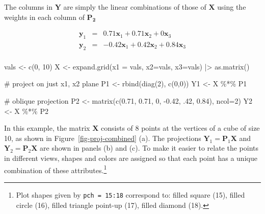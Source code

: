 \documentclass[
  letterpaper,
  10pt,
  krantz2]{krantz}
\makeatletter
\newenvironment{Shaded}{\begin{snugshade}}{\end{snugshade}}
\newcommand{\AttributeTok}[1]{\textcolor[rgb]{0.40,0.45,0.13}{#1}}
\newcommand{\CommentTok}[1]{\textcolor[rgb]{0.37,0.37,0.37}{#1}}
\newcommand{\DecValTok}[1]{\textcolor[rgb]{0.68,0.00,0.00}{#1}}
\newcommand{\FloatTok}[1]{\textcolor[rgb]{0.68,0.00,0.00}{#1}}
\newcommand{\FunctionTok}[1]{\textcolor[rgb]{0.28,0.35,0.67}{#1}}
\newcommand{\NormalTok}[1]{\textcolor[rgb]{0.00,0.23,0.31}{#1}}
\newcommand{\OtherTok}[1]{\textcolor[rgb]{0.00,0.23,0.31}{#1}}
\newcommand{\SpecialCharTok}[1]{\textcolor[rgb]{0.37,0.37,0.37}{#1}}
\newenvironment{kframe}{%
  \medskip{}
  \setlength{\fboxsep}{.8em}
  \def\at@end@of@kframe{}%
  \ifinner\ifhmode%
  \def\at@end@of@kframe{\end{minipage}}%
  \begin{minipage}{\columnwidth}%
  \fi\fi%
  \def\FrameCommand##1{\hskip\@totalleftmargin \hskip-\fboxsep
  \colorbox{shadecolor}{##1}\hskip-\fboxsep
      \hskip-\linewidth \hskip-\@totalleftmargin \hskip\columnwidth}%
  \MakeFramed {\advance\hsize-\width
    \@totalleftmargin\z@ \linewidth\hsize
    \@setminipage}}%
{\par\unskip\endMakeFramed%
  \at@end@of@kframe}
\renewenvironment{Shaded}{\begin{kframe}}{\end{kframe}}
\makeatother
\begin{document}
The columns in \(\mathbf{Y}\) are simply the linear combinations of
those of \(\mathbf{X}\) using the weights in each column of
\(\mathbf{P_2}\)

\[
\begin{eqnarray*}
\mathbf{y}_1 & = & 0.71 \mathbf{x}_1 + 0.71 \mathbf{x}_2 + 0 \mathbf{x}_3\\
\mathbf{y}_2 & = & -0.42 \mathbf{x}_1 + 0.42 \mathbf{x}_2 + 0.84 \mathbf{x}_3 \\
\end{eqnarray*}
\]

\begin{Shaded}
\begin{Highlighting}[]
\NormalTok{vals }\OtherTok{\textless{}{-}} \FunctionTok{c}\NormalTok{(}\DecValTok{0}\NormalTok{, }\DecValTok{10}\NormalTok{)}
\NormalTok{X }\OtherTok{\textless{}{-}} \FunctionTok{expand.grid}\NormalTok{(}\AttributeTok{x1 =}\NormalTok{ vals, }\AttributeTok{x2=}\NormalTok{vals, }\AttributeTok{x3=}\NormalTok{vals) }\SpecialCharTok{|\textgreater{}} \FunctionTok{as.matrix}\NormalTok{()}

\CommentTok{\# project on just x1, x2 plane}
\NormalTok{P1 }\OtherTok{\textless{}{-}} \FunctionTok{rbind}\NormalTok{(}\FunctionTok{diag}\NormalTok{(}\DecValTok{2}\NormalTok{), }\FunctionTok{c}\NormalTok{(}\DecValTok{0}\NormalTok{,}\DecValTok{0}\NormalTok{))}
\NormalTok{Y1 }\OtherTok{\textless{}{-}}\NormalTok{ X }\SpecialCharTok{\%*\%}\NormalTok{ P1}

\CommentTok{\# oblique projection}
\NormalTok{P2 }\OtherTok{\textless{}{-}} \FunctionTok{matrix}\NormalTok{(}\FunctionTok{c}\NormalTok{(}\FloatTok{0.71}\NormalTok{, }\FloatTok{0.71}\NormalTok{, }\DecValTok{0}\NormalTok{, }\SpecialCharTok{{-}}\FloatTok{0.42}\NormalTok{, .}\DecValTok{42}\NormalTok{, }\FloatTok{0.84}\NormalTok{), }\AttributeTok{ncol=}\DecValTok{2}\NormalTok{)}
\NormalTok{Y2 }\OtherTok{\textless{}{-}}\NormalTok{ X }\SpecialCharTok{\%*\%}\NormalTok{ P2}
\end{Highlighting}
\end{Shaded}

In this example, the matrix \(\mathbf{X}\) consists of 8 points at the
vertices of a cube of size 10, as shown in
Figure~\ref{fig-proj-combined} (a). The projections
\(\mathbf{Y}_1 = \mathbf{P}_1 \mathbf{X}\) and
\(\mathbf{Y}_2 = \mathbf{P}_2 \mathbf{X}\) are shown in panels (b) and
(c). To make it easier to relate the points in different views, shapes
and colors are assigned so that each point has a unique combination of
these attributes.\footnote{Plot shapes given by \texttt{pch\ =\ 15:18}
  correspond to: filled square (15), filled circle (16), filled triangle
  point-up (17), filled diamond (18).}
\end{document}
